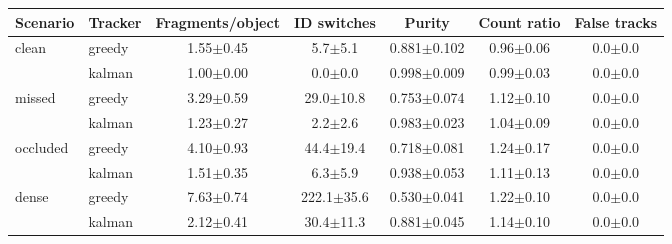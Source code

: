 \begin{tabular}{@{}llccccc@{}}
\toprule
Scenario & Tracker & Fragments/object & ID switches & Purity & Count ratio & False tracks \\
\midrule
clean & greedy & 1.55$\pm$0.45 & 5.7$\pm$5.1 & 0.881$\pm$0.102 & 0.96$\pm$0.06 & 0.0$\pm$0.0 \\
 & kalman & 1.00$\pm$0.00 & 0.0$\pm$0.0 & 0.998$\pm$0.009 & 0.99$\pm$0.03 & 0.0$\pm$0.0 \\
missed & greedy & 3.29$\pm$0.59 & 29.0$\pm$10.8 & 0.753$\pm$0.074 & 1.12$\pm$0.10 & 0.0$\pm$0.0 \\
 & kalman & 1.23$\pm$0.27 & 2.2$\pm$2.6 & 0.983$\pm$0.023 & 1.04$\pm$0.09 & 0.0$\pm$0.0 \\
occluded & greedy & 4.10$\pm$0.93 & 44.4$\pm$19.4 & 0.718$\pm$0.081 & 1.24$\pm$0.17 & 0.0$\pm$0.0 \\
 & kalman & 1.51$\pm$0.35 & 6.3$\pm$5.9 & 0.938$\pm$0.053 & 1.11$\pm$0.13 & 0.0$\pm$0.0 \\
dense & greedy & 7.63$\pm$0.74 & 222.1$\pm$35.6 & 0.530$\pm$0.041 & 1.22$\pm$0.10 & 0.0$\pm$0.0 \\
 & kalman & 2.12$\pm$0.41 & 30.4$\pm$11.3 & 0.881$\pm$0.045 & 1.14$\pm$0.10 & 0.0$\pm$0.0 \\
\bottomrule
\end{tabular}
